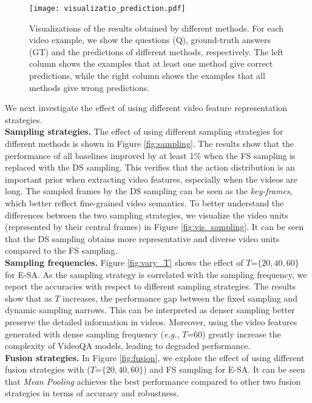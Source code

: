\documentclass[letterpaper]{article} \usepackage{aaai19}  \usepackage{times}  \usepackage{helvet}  \usepackage{courier}  \usepackage{url}  \usepackage{graphicx}  \usepackage{amsfonts}
\begin{document}
\begin{figure*}
\centering
\texttt{[image: visualizatio\_prediction.pdf]}
\caption{Visualizations of the results obtained by different methods. For each video example, we show the questions (Q), ground-truth answers (GT) and the predictions of different methods, respectively. The left column shows the examples that at least one method give correct predictions, while the right column shows the examples that all methods give wrong predictions.}
\label{fig:vis_results}
\end{figure*}
We next investigate the effect of using different video feature representation strategies.
\\
\textbf{Sampling strategies.} The effect of using different sampling strategies for different methods is shown in Figure \ref{fig:sampling}. The results show that the performance of all baselines improved by at least 1$\%$ when the FS sampling is replaced with the DS sampling. This verifies that the action distribution is an important prior when extracting video features, especially when the videos are long. The sampled frames by the DS sampling can be seen as the \emph{key-frames}, which better reflect fine-grained video semantics. To better understand the differences between the two sampling strategies, we visualize the video units (represented by their central frames) in Figure \ref{fig:vis_sampling}. It can be seen that the DS sampling obtains more representative and diverse video units compared to the FS sampling.
\\
\textbf{Sampling frequencies.} Figure \ref{fig:vary_T} shows the effect of $T$=$\{20, 40, 60\}$ for E-SA. As the sampling strategy is correlated with the sampling frequency, we report the accuracies with respect to different sampling strategies. The results show that as $T$ increases, the performance gap between the fixed sampling and dynamic sampling narrows. This can be interpreted as denser sampling better preserve the detailed information in videos. Moreover, using the video features generated with dense sampling frequency (\emph{e.g.}, $T$=60) greatly increase the complexity of VideoQA models, leading to degraded performance.
\\
\textbf{Fusion strategies.} In Figure \ref{fig:fusion}, we explore the effect of using different fusion strategies with ($T$=$\{20,40,60\}$) and FS sampling for E-SA. It can be seen that \emph{Mean Pooling} achieves the best performance compared to other two fusion strategies in terms of accuracy and robustness.
\end{document}
